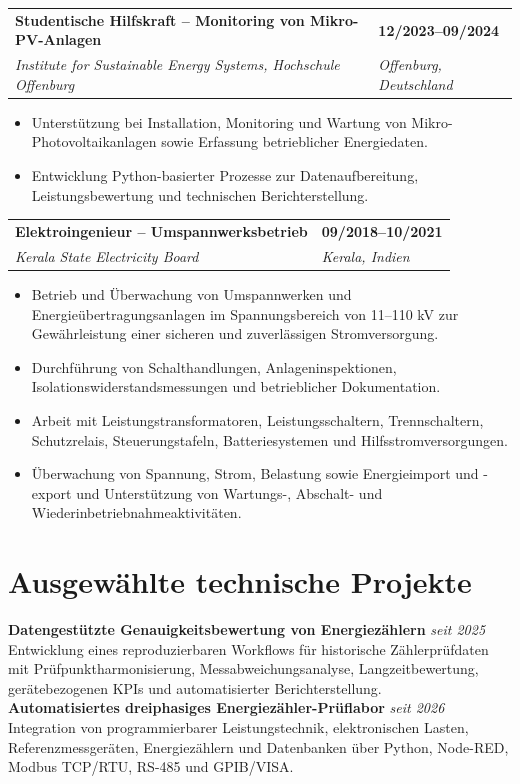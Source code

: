 \documentclass[10pt,a4paper]{article}
\makeatletter
\newcommand{\entry}[4]{\begin{tabularx}{\textwidth}{@{}X>{\raggedleft\arraybackslash}p{3.1cm}@{}}\textbf{#1} & \textbf{#2}\\\textit{#3} & \textit{#4}\end{tabularx}\vspace{1pt}}
\makeatother
\begin{document}
\entry{Studentische Hilfskraft -- Monitoring von Mikro-PV-Anlagen}{12/2023--09/2024}{Institute for Sustainable Energy Systems, Hochschule Offenburg}{Offenburg, Deutschland}
\begin{itemize}
\item Unterstützung bei Installation, Monitoring und Wartung von Mikro-Photovoltaikanlagen sowie Erfassung betrieblicher Energiedaten.
\item Entwicklung Python-basierter Prozesse zur Datenaufbereitung, Leistungsbewertung und technischen Berichterstellung.
\end{itemize}

\newpage
\entry{Elektroingenieur -- Umspannwerksbetrieb}{09/2018--10/2021}{Kerala State Electricity Board}{Kerala, Indien}
\begin{itemize}
\item Betrieb und Überwachung von Umspannwerken und Energieübertragungsanlagen im Spannungsbereich von 11--110 kV zur Gewährleistung einer sicheren und zuverlässigen Stromversorgung.
\item Durchführung von Schalthandlungen, Anlageninspektionen, Isolationswiderstandsmessungen und betrieblicher Dokumentation.
\item Arbeit mit Leistungstransformatoren, Leistungsschaltern, Trennschaltern, Schutzrelais, Steuerungstafeln, Batteriesystemen und Hilfsstromversorgungen.
\item Überwachung von Spannung, Strom, Belastung sowie Energieimport und -export und Unterstützung von Wartungs-, Abschalt- und Wiederinbetriebnahmeaktivitäten.
\end{itemize}

\section{Ausgewählte technische Projekte}
\textbf{Datengestützte Genauigkeitsbewertung von Energiezählern} \hfill \textit{seit 2025}\\[-2pt]
Entwicklung eines reproduzierbaren Workflows für historische Zählerprüfdaten mit Prüfpunktharmonisierung, Messabweichungsanalyse, Langzeitbewertung, gerätebezogenen KPIs und automatisierter Berichterstellung.\\[4pt]

\textbf{Automatisiertes dreiphasiges Energiezähler-Prüflabor} \hfill \textit{seit 2026}\\[-2pt]
Integration von programmierbarer Leistungstechnik, elektronischen Lasten, Referenzmessgeräten, Energiezählern und Datenbanken über Python, Node-RED, Modbus TCP/RTU, RS-485 und GPIB/VISA.\\[4pt]
\end{document}
